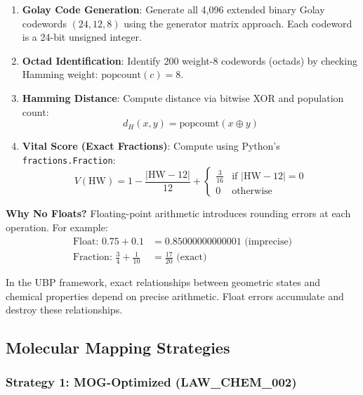 \documentclass[11pt,letterpaper]{article}
\begin{document}
\begin{enumerate}
    \item \textbf{Golay Code Generation}: Generate all 4,096 extended binary Golay codewords $(24, 12, 8)$ using the generator matrix approach. Each codeword is a 24-bit unsigned integer.
    
    \item \textbf{Octad Identification}: Identify 200 weight-8 codewords (octads) by checking Hamming weight: $\text{popcount}(c) = 8$.
    
    \item \textbf{Hamming Distance}: Compute distance via bitwise XOR and population count:
    \begin{equation}
    d_H(x, y) = \text{popcount}(x \oplus y)
    \end{equation}
    
    \item \textbf{Vital Score (Exact Fractions)}: Compute using Python's \texttt{fractions.Fraction}:
    \begin{equation}
    V(\text{HW}) = 1 - \frac{|\text{HW} - 12|}{12} + \begin{cases}
    \frac{3}{16} & \text{if } |\text{HW} - 12| = 0 \\
    0 & \text{otherwise}
    \end{cases}
    \end{equation}
\end{enumerate}

\textbf{Why No Floats?} Floating-point arithmetic introduces rounding errors at each operation. For example:
\begin{align}
\text{Float: } 0.75 + 0.1 &= 0.85000000000001 \text{ (imprecise)} \\
\text{Fraction: } \frac{3}{4} + \frac{1}{10} &= \frac{17}{20} \text{ (exact)}
\end{align}

In the UBP framework, exact relationships between geometric states and chemical properties depend on precise arithmetic. Float errors accumulate and destroy these relationships.

\subsection{Molecular Mapping Strategies}

\subsubsection{Strategy 1: MOG-Optimized (LAW\_CHEM\_002)}
\end{document}
